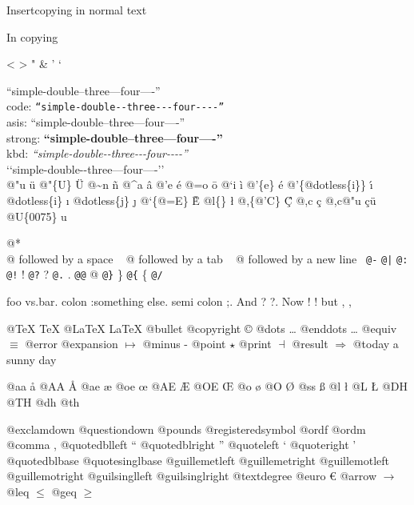 \documentclass{book}
\begin{document}
\label{anchor:Top}Insertcopying in normal text


In copying


<
>
"
\&
'
`


``simple-double--three---four----''\leavevmode{}\\
code: \texttt{``simple-double{-}{-}three{-}{-}{-}four{-}{-}{-}-''} \leavevmode{}\\
asis: ``simple-double--three---four----'' \leavevmode{}\\
strong: \textbf{``simple-double--three---four----''} \leavevmode{}\\
kbd: {\ttfamily\textsl{``simple-double{-}{-}three{-}{-}{-}four{-}{-}{-}-''}} \leavevmode{}\\


`\hbox{}`simple-double-\hbox{}-three---four----'\hbox{}'\leavevmode{}\\


@"u \"{u} 
@"\{U\} \"{U} 
@\~{}n \~{n}
@\^{}a \^{a}
@'e \'{e}
@=o \={o}
@`i \`{i}
@'\{e\} \'{e}
@'\{@dotless\{i\}\} \'{\i{}} 
@dotless\{i\} \i{}
@dotless\{j\} \j{}
@`\{@=E\} \`{\={E}} 
@l\{\} \l{}
@,\{@'C\} \c{\'{C}}
@,c \c{c}
@,c@"u \c{c}\"{u} \leavevmode{}\\


@U\{0075\} u


@* \leavevmode{}\\
@ followed by a space
\ {}
@ followed by a tab
\ {}
@ followed by a new line
\ {}\texttt{@-} \-{}
\texttt{@|} 
\texttt{@:} \@
\texttt{@!} \@!
\texttt{@?} \@?
\texttt{@.} \@.
\texttt{@@} @
\texttt{@\}} \}
\texttt{@\{} \{
\texttt{@/} 


foo vs.\@ bar. 
colon :\@And something else.
semi colon ;\@.
And ? ?\@.
Now ! !\@@
but , ,\@


@TeX \TeX{}
@LaTeX \LaTeX{}
@bullet \textbullet{}
@copyright \copyright{}
@dots \dots{}\@
@enddots \dots{}
@equiv $\equiv{}$
@error 
@expansion $\mapsto{}$
@minus -
@point $\star{}$
@print $\dashv{}$
@result $\Rightarrow{}$
@today a sunny day


@aa \aa{}
@AA \AA{}
@ae \ae{}
@oe \oe{}
@AE \AE{}
@OE \OE{}
@o \o{}
@O \O{}
@ss \ss{}
@l \l{}
@L \L{}
@DH \DH{}
@TH \TH{}
@dh \dh{}
@th \th{}


@exclamdown \textexclamdown{}
@questiondown \textquestiondown{}
@pounds \textsterling{}
@registeredsymbol \circledR{}
@ordf \textordfeminine{}
@ordm \textordmasculine{}
@comma ,
@quotedblleft \textquotedblleft{}
@quotedblright \textquotedblright{}
@quoteleft \textquoteleft{}
@quoteright \textquoteright{}
@quotedblbase \quotedblbase{}
@quotesinglbase \quotesinglbase{}
@guillemetleft \guillemotleft{}
@guillemetright \guillemotright{}
@guillemotleft \guillemotleft{}
@guillemotright \guillemotright{}
@guilsinglleft \guilsinglleft{}
@guilsinglright \guilsinglright{}
@textdegree \textdegree{}
@euro \euro{}
@arrow $\rightarrow{}$
@leq $\leq{}$
@geq $\geq{}$
\end{document}
